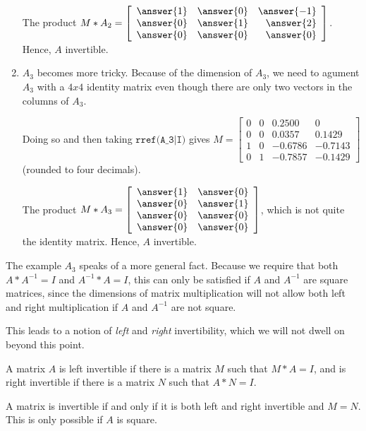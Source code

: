 \documentclass{ximera}
\begin{document}
\begin{exploration}
\begin{enumerate}
    The product $M*A_2=   \startmat{rrr}
    \answer{1} & \answer{0} & \answer{-1} \\ 
    \answer{0} & \answer{1} & \answer{2} \\ 
    \answer{0} & \answer{0} & \answer{0} 
  \stopmat$. Hence, $A$   invertible.
    \item $A_3$ becomes more tricky. Because of the dimension of $A_3$, we need to agument $A_3$ with a $4x4$ identity matrix even though there are only two vectors in the columns of $A_3$. 
    
    Doing so and then taking $\texttt{rref(A\_3|I)}$ gives $M = \begin{bmatrix} 
      0 & 0 & 0.2500 & 0 \\ 
      0 & 0 & 0.0357 & 0.1429 \\ 
      1 & 0 & -0.6786 & -0.7143 \\ 
      0 & 1 & -0.7857 & -0.1429 
      \end{bmatrix}$ (rounded to four decimals).
      
    The product $M*A_3=   \startmat{rrr}
    \answer{1} & \answer{0}  \\ 
    \answer{0} & \answer{1}  \\ 
    \answer{0} & \answer{0} \\
    \answer{0} & \answer{0}
  \stopmat$, which is not quite the identity matrix. Hence, $A$   invertible.
  \end{enumerate}

\end{exploration}

\begin{remark}
  The example $A_3$ speaks of a more general fact. Because we require that both $A*A^{-1}=I$ and $A^{-1}*A=I$, this can only be satisfied if $A$ and $A^{-1}$ are square matrices, since the dimensions of matrix multiplication will not allow both left and right multiplication if $A$ and $A^{-1}$ are not square. 

  This leads to a notion of \emph{left} and \emph{right} invertibility, which we will not dwell on beyond this point.
\end{remark}

\begin{definition}
  A matrix $A$ is left invertible if there is a matrix $M$ such that $M*A=I$, and is right invertible if there is a matrix $N$ such that $A*N=I$. 
  
  A matrix is invertible if and only if it is both left and right invertible and $M=N$. This is only possible if $A$ is square.
\end{definition}
\end{document}

